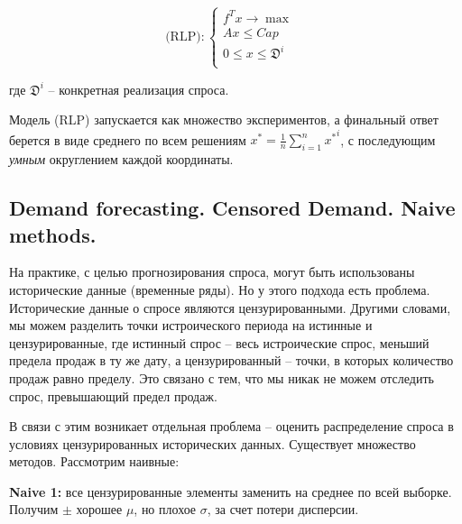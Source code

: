 \documentclass[reqno]{article}
\theoremstyle{definition}
\theoremstyle{definition}
\theoremstyle{definition}
\theoremstyle{definition}
\theoremstyle{definition}
\theoremstyle{definition}
\theoremstyle{definition}
\theoremstyle{definition}
\theoremstyle{definition}
\begin{document}
		$$
		\text{(RLP)}:
		\begin{cases}
			f^Tx \rightarrow \max & \\
			Ax \leq Cap & \\
			0 \leq x \leq \mathfrak{D}^i & \\
		\end{cases}	
		$$
		
		где $\mathfrak{D}^i$ -- конкретная реализация спроса.
		
		Модель (RLP) запускается как множество экспериментов, а финальный ответ берется в виде среднего по всем решениям $x^* = \frac{1}{n}\sum\limits^n_{i = 1} {x^*}^i$, с последующим \textit{умным} округлением каждой координаты.
		
		
		\subsection{Demand forecasting. Censored Demand. Naive methods.}
		
		На практике, с целью прогнозирования спроса, могут быть использованы исторические данные (временные ряды). Но у этого подхода есть проблема. Исторические данные о спросе являются цензурированными. Другими словами, мы можем разделить точки истроического периода на истинные и цензурированные, где истинный спрос -- весь истроические спрос, меньший предела продаж в ту же дату, а цензурированный -- точки, в которых количество продаж равно пределу. Это связано с тем, что мы никак не можем отследить спрос, превышающий предел продаж.
		
		В связи с этим возникает отдельная проблема -- оценить распределение спроса в условиях цензурированных исторических данных. Существует множество методов. Рассмотрим наивные:
		
		\textbf{Naive 1:} все цензурированные элементы заменить на среднее по всей выборке. Получим $\pm$ хорошее $\mu$, но плохое $\sigma$, за счет потери дисперсии.
		
		
		
		
\end{document}
